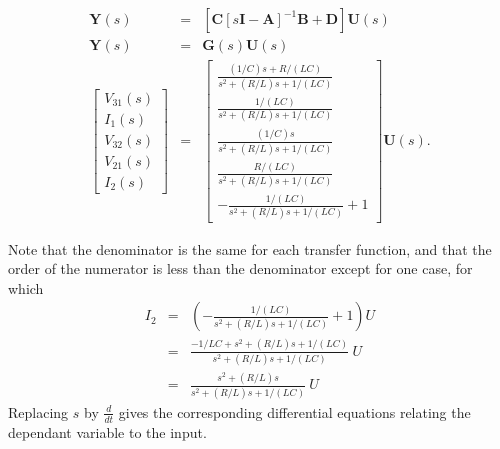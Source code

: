 \begin{slide}
  \label{slide:l2final}
\begin{eqnarray*}
\mathbf{Y}(s)&=&\left[\mathbf{C}\left[s\mathbf{I}-\mathbf{A}\right]^{-1}\mathbf{B}+\mathbf{D}\right]\mathbf{U}(s)\\
\mathbf{Y}(s) &=& \mathbf{G}(s)\mathbf{U}(s)\\
\left[\begin{array}{c}
  V_{31}(s) \\
  I_1(s) \\
  V_{32}(s) \\
  V_{21}(s) \\
  I_{2}(s)
\end{array}\right] &=& \left[\begin{array}{c}
  \frac{(1/C)s+R/(LC)}{s^2 + (R/L)s
+1/(LC)} \\
  \frac{1/(LC)}{s^2 + (R/L)s
+1/(LC)} \\
  \frac{(1/C)s}{s^2 + (R/L)s
+1/(LC)} \\
  \frac{R/(LC)}{s^2 + (R/L)s
+1/(LC)} \\
  -\frac{1/(LC)}{s^2 + (R/L)s
+1/(LC)}+1
\end{array}\right]\mathbf{U}(s).
\end{eqnarray*}
\end{slide}
Note that the denominator is the same for each transfer function,
and that the order of the numerator is less than the denominator
except for one case, for which
\begin{eqnarray*}
I_2 & = & \left(-\frac{1/(LC)}{s^2 + (R/L)s +1/(LC)}+1\right)U\\
    & = & \frac{-1/{LC}+s^2 + (R/L)s +1/(LC)}{s^2 + (R/L)s
    +1/(LC)}\ U
    \\
    & = &\frac{s^2 + (R/L)s}{s^2 + (R/L)s
    +1/(LC)}\ U
\end{eqnarray*}
Replacing $s$ by $\frac{d}{dt}$ gives the corresponding
differential equations relating the dependant variable to the
input.


\endinput

